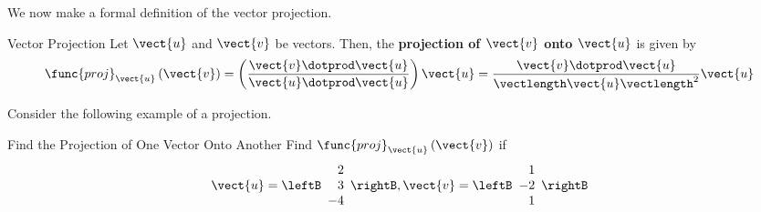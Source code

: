 We now make a formal definition of the vector projection.

\begin{definition}{Vector Projection}\label{def:projection}
Let $\vect{u}$ and $\vect{v}$ be vectors. Then, the \textbf{projection of $\vect{v}$ onto
$\vect{u}$} is given by 
\begin{equation*}
\func{proj}_{\vect{u}}\left( \vect{v}\right) =\left( \vspace{0.05in}
\frac{\vect{v}\dotprod \vect{u}}{\vect{u}\dotprod \vect{u}}\right) \vect{u}
=
\frac{\vect{v}\dotprod \vect{u}}{\vectlength \vect{u}\vectlength ^{2}}\vect{u}
\end{equation*}
\end{definition}

Consider the following example of a projection.

\begin{example}{Find the Projection of One Vector Onto Another}\label{exa:vectorprojection}
Find 
$\func{proj}_{\vect{u}}\left( \vect{v}\right) $ if 
\begin{equation*}
\vect{u}=
\leftB
\begin{array}{r}
2 \\
3 \\
-4
\end{array}
\rightB,
\vect{v}=
\leftB
\begin{array}{r}
1 \\
-2 \\
1
\end{array}
\rightB
\end{equation*}
\end{example}

